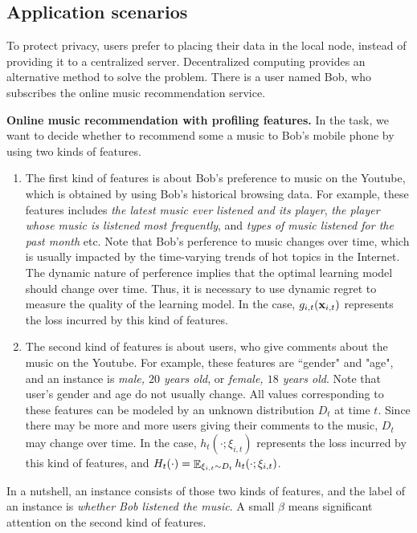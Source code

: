 \documentclass{article}
\begin{document}
\subsection{Application scenarios}
\label{subsection_application_scenarions}
{\color{blue}
To protect privacy, users prefer to placing their data in the local node, instead of providing it to a centralized server. Decentralized computing provides an alternative method to solve the problem. There is a user named Bob, who subscribes the online music recommendation service.

\textbf{Online music recommendation with profiling features.}
In the task, we want to decide whether to recommend some a music to Bob's mobile phone by using two kinds of features. 
\begin{enumerate}
\item The first kind of features is about Bob's preference to music on the Youtube, which is obtained by using Bob's historical browsing data. For example, these features includes \textit{the latest music ever listened and its player}, \textit{the player whose music is listened most frequently}, and \textit{types of music listened for the past month} etc.  Note that Bob's perference to music changes over time, which is usually impacted by the time-varying trends of hot topics in the Internet. The dynamic nature of perference implies that the optimal learning model should change over time. Thus, it is necessary to use dynamic regret to measure the  quality of the learning model.  In the case, $g_{i,t}({\bf x}_{i,t})$ represents the loss incurred by this kind of features.
\item The second kind of features is about users, who give comments about the music on the Youtube. For example, these features are ``gender" and "age", and an instance is \textit{male, $20$ years old}, or \textit{female, $18$ years old}. Note that user's gender and age do not usually change. All values corresponding to these features can be modeled by an unknown distribution $D_t$ at time $t$. Since there may be more and more users giving their comments to the music, $D_t$ may change over time. In the case, $h_t(\cdot; \xi_{i,t})$ represents the loss incurred by this kind of features, and $H_t(\cdot) = \mathop{\mathbb{E}}_{\xi_{i,t}\sim D_t}h_t(\cdot; \xi_{i,t})$.
\end{enumerate} In a nutshell, an instance consists of those two kinds of features, and the label of an instance is \textit{whether Bob listened the music}. A small $\beta$ means significant attention on the second kind of features.

}
\end{document}
